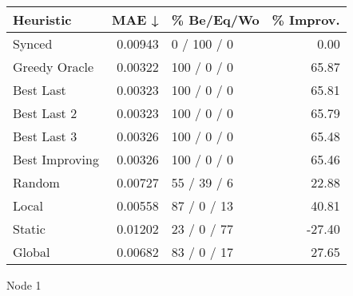 \begin{tabular}{lrlr}
\toprule
\textbf{Heuristic} & \textbf{MAE ↓} & \textbf{\% Be/Eq/Wo} & \textbf{\% Improv.} \\
\midrule
            Synced &        0.00943 &          0 / 100 / 0 &                0.00 \\
     Greedy Oracle &        0.00322 &          100 / 0 / 0 &               65.87 \\
         Best Last &        0.00323 &          100 / 0 / 0 &               65.81 \\
       Best Last 2 &        0.00323 &          100 / 0 / 0 &               65.79 \\
       Best Last 3 &        0.00326 &          100 / 0 / 0 &               65.48 \\
    Best Improving &        0.00326 &          100 / 0 / 0 &               65.46 \\
            Random &        0.00727 &          55 / 39 / 6 &               22.88 \\
             Local &        0.00558 &          87 / 0 / 13 &               40.81 \\
            Static &        0.01202 &          23 / 0 / 77 &              -27.40 \\
            Global &        0.00682 &          83 / 0 / 17 &               27.65 \\
\bottomrule
\end{tabular}
\caption{Node 1}
\label{tab:non_lr01_le2_bs2_1}
